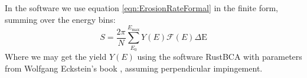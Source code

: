 \documentclass{article}
\begin{document}
In the software we use equation \ref{eqn:ErosionRateFormal} in the finite form,
summing over the energy bins:
\begin{equation}
S = \frac{2\pi}{N}\sum_{E_0}^{E_{\text{max}}} Y(E)\mathcal{F}(E)\Delta\text{E}
    \label{eqn:ErosionRateFinite}
\end{equation}
Where we may get the yield $Y(E)$ using the software RustBCA\cite{RustBCA} with
parameters from Wolfgang Eckstein's book \cite{eckstein2013computer}, assuming
perpendicular impingement.


\end{document}

